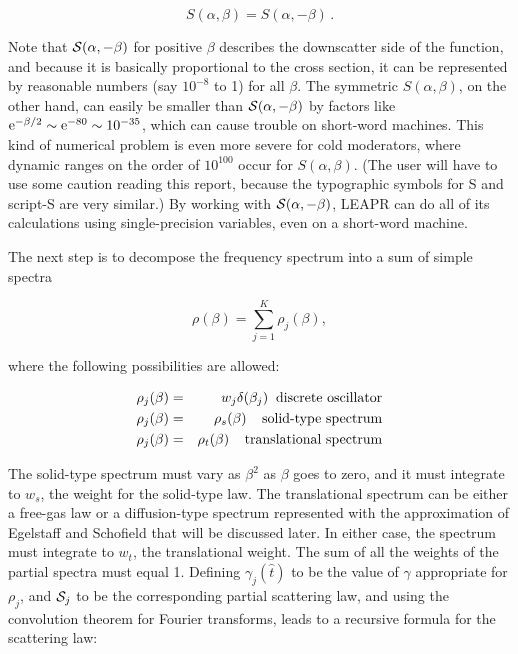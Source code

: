 \begin{equation}
   S(\alpha,\beta)=S(\alpha,-\beta)\,.
\end{equation}

\noindent
Note that ${\cal S}(\alpha,-\beta)$ for positive $\beta$ describes
the downscatter side of the function, and because it is basically
proportional to the cross section, it can be represented by reasonable
numbers (say $10^{-8}$ to 1) for all $\beta$.  The symmetric
$S(\alpha,\beta)$, on the other hand, can easily be smaller than ${\cal
S}(\alpha,-\beta)$ by factors like ${\rm e}^{-\beta/2} \sim {\rm e}^{-80}
\sim 10^{-35}$, which can cause trouble on short-word machines.
This kind of numerical problem is even more severe for cold moderators,
where dynamic ranges on the order of $10^{100}$ occur for
$S(\alpha,\beta)$.  (The user will have to use some caution reading this
report, because the typographic symbols for S and script-S are very
similar.)  By working with ${\cal S}(\alpha,-\beta)$, LEAPR can do all
of its calculations using single-precision variables, even on
a short-word machine.

The next step is to decompose the frequency spectrum into a sum of
simple spectra

\begin{equation}
   \rho(\beta)=\sum_{j=1}^K\rho_j(\beta),
\end{equation}
\vspace{0.5 pt}

\noindent
where the following possibilities are allowed:

\begin{eqnarray}
  \rho_j(\beta) &=& w_j\delta(\beta_j)\;\; \hbox{discrete oscillator}\\
  \rho_j(\beta) &=& \rho_s(\beta)  \;\;\;\; \hbox{solid-type spectrum}\\
  \rho_j(\beta) &=& \rho_t(\beta)  \;\;\;\; \hbox{translational spectrum}
\end{eqnarray}

\noindent
The solid-type spectrum must vary as $\beta^2$ as $\beta$ goes to zero,
and it must integrate to $w_s$, the weight for the solid-type law.  The
translational spectrum can be either a free-gas law or a diffusion-type
spectrum represented with the approximation of Egelstaff and Schofield
that will be discussed later.  In either case, the spectrum must
integrate to $w_t$, the translational weight.  The sum of all the
weights of the partial spectra must equal 1.  Defining
$\gamma_j(\hat{t})$ to be the value of $\gamma$ appropriate for
$\rho_j$, and ${\cal S}_j$ to be the corresponding partial scattering law,
and using the convolution theorem for Fourier transforms, leads to a
recursive formula for the scattering law:

